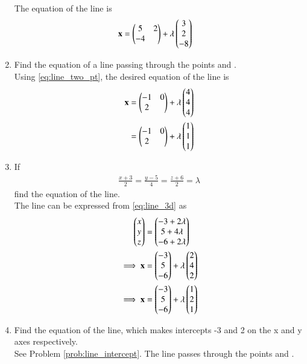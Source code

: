 \begin{enumerate}[label=\arabic*.,ref=\thesubsection.\theenumi]
\\
\solution The equation of the line is 
\begin{align}
\mathbf{x} &= \begin{pmatrix}5 & 2\\-4\end{pmatrix} + \lambda \begin{pmatrix}3\\2\\-8\end{pmatrix}
\end{align}
%
\item Find the equation of a line passing through the points  and .
\\
\solution Using  \eqref{eq:line_two_pt}, the desired equation of the line is
\begin{align}
\mathbf{x} &= \begin{pmatrix}-1 & 0\\2\end{pmatrix} + \lambda \begin{pmatrix}4\\4\\4\end{pmatrix}
\\
&= \begin{pmatrix}-1 & 0\\2\end{pmatrix} + \lambda \begin{pmatrix}1\\1\\1\end{pmatrix}
\end{align}
%
\item If
\begin{align}
%
\label{eq:line_3d}
\frac{x+3}{2} = \frac{y-5}{4} = \frac{z+6}{2} = \lambda
\end{align}
%
find the equation of the line.
\label{prob:line_3d}
\\
\solution The line can be expressed from \eqref{eq:line_3d} as
%
\begin{align}
\begin{pmatrix}x\\y\\z\end{pmatrix} &= \begin{pmatrix}-3+2\lambda\\5+4\lambda\\-6+2\lambda\end{pmatrix}
\\
\implies \mathbf{x} &= \begin{pmatrix}-3\\5\\-6\end{pmatrix} + \lambda \begin{pmatrix}2\\4\\2\end{pmatrix}
\\
\implies \mathbf{x} &= \begin{pmatrix}-3\\5\\-6\end{pmatrix} + \lambda \begin{pmatrix}1\\2\\1\end{pmatrix}
\end{align}
%
\item Find the equation of the line, which makes intercepts -3 and 2 on the x and y axes respectively.
\\
\solution See Problem \ref{prob:line_intercept}.  The line passes through the points  and .


\end{enumerate}
